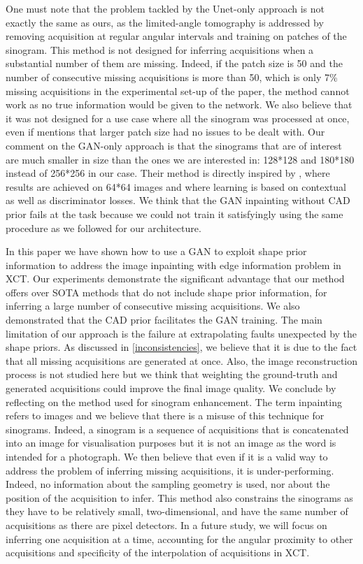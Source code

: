 \documentclass[../main.tex]{subfiles}
\begin{document}
\label{sec:conclusion}
One must note that the problem tackled by the Unet-only approach is not exactly the same as ours, as the limited-angle tomography is addressed by removing acquisition at regular angular intervals and training on patches of the sinogram. This method is not designed for inferring acquisitions when a substantial number of them are missing. Indeed, if the patch size is 50 and the number of consecutive missing acquisitions is more than 50, which is only 7\% missing acquisitions in the experimental set-up of the paper, the method cannot work as no true information would be given to the network. We also believe that it was not designed for a use case where all the sinogram was processed at once, even if \cite{lee2018deep} mentions that larger patch size had no issues to be dealt with. Our comment on the GAN-only approach is that the sinograms that are of interest are much smaller in size than the ones we are interested in: 128*128 and 180*180 instead of 256*256 in our case. Their method is directly inspired by \cite{yeh2016semantic}, where results are achieved on 64*64 images and where learning is based on contextual as well as discriminator losses. We think that the GAN inpainting without CAD prior fails at the task because we could not train it satisfyingly using the same procedure as we followed for our architecture. 

In this paper we have shown how to use a GAN to exploit shape prior information to address the image inpainting with edge information problem in XCT. Our experiments demonstrate the significant advantage that our method offers over SOTA methods that do not include shape prior information, for inferring a large number of consecutive missing acquisitions. We also demonstrated that the CAD prior facilitates the GAN training. The main limitation of our approach is the failure at extrapolating faults unexpected by the shape priors. As discussed in \ref{inconsistencies}, we believe that it is due to the fact that all missing acquisitions are generated at once. Also, the image reconstruction process is not studied here but we think that weighting the ground-truth and generated acquisitions could improve the final image quality. We conclude by reflecting on the method used for sinogram enhancement. The term inpainting refers to images and we believe that there is a misuse of this technique for sinograms. Indeed, a sinogram is a sequence of acquisitions that is concatenated into an image for visualisation purposes but it is not an image as the word  is intended for a photograph. We then believe that even if it is a valid way to address the problem of inferring missing acquisitions, it is under-performing. Indeed, no information about the sampling geometry is used, nor about the position of the acquisition to infer. This method also constrains the sinograms as they have to be relatively small, two-dimensional, and have the same number of acquisitions as there are pixel detectors. In a future study, we will focus on inferring one acquisition at a time, accounting for the angular proximity to other acquisitions and specificity of the interpolation of acquisitions in XCT.
\end{document}
